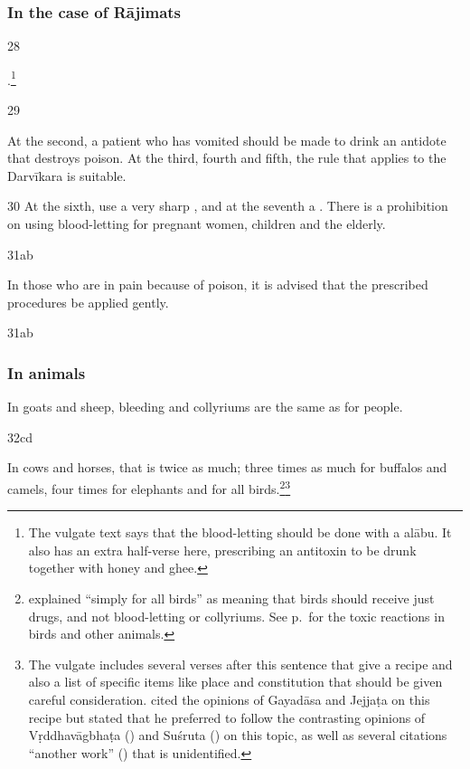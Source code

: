 \begin{translation}
\subsubsection{In the case of Rājimats}

\item[28]

.\footnote{The vulgate text says that the blood-letting should be
    done with a \gls{alābu}.  It also has an extra half-verse here,
    prescribing an antitoxin to be drunk together with honey and ghee.}

\item [29]

At the second, a patient who has vomited should be made to drink an antidote 
that destroys poison.   At the third, fourth and fifth, the rule that applies to the 
Darvīkara is suitable. 



\item [30] At the sixth, use a very sharp , and at
the seventh a .  There is a prohibition
    on using blood-letting for pregnant women, children and the elderly.

\item [31ab]

In those who are in pain because of poison, it is advised that the prescribed 
procedures be applied gently. 

\item [31ab]

\subsubsection{In animals}
In goats and sheep, bleeding and collyriums are the same as for people. 

\item [32cd]

In cows and horses, that is twice as much; three times as much for buffalos and 
camels, four times for elephants and  for all birds.\footnote{ 
 explained “simply for all birds” as meaning that birds 
should receive just drugs, and not blood-letting or collyriums.  See 
p.\,\pageref{bird-pulse} for the toxic reactions in birds and other 
animals.}\footnote{The vulgate includes 
several verses after this
    sentence that give a recipe and also a list of specific items like place
    and constitution that should be given careful consideration.
     cited the opinions of Gayadāsa and Jejjaṭa on this
    recipe but stated that he preferred to follow the contrasting opinions of
    Vṛddhavāgbhaṭa () and Suśruta
    () on this topic, as well as several citations
    “another work” () that is unidentified.}



\end{translation}
